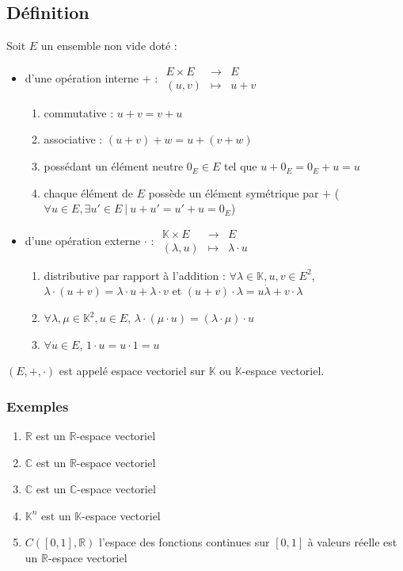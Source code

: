 \documentclass[a4paper,10pt]{book} %
\newcommand{\R}{\mathbb{R}}
\newcommand{\C}{\mathbb{C}}
\newcommand{\K}{\mathbb{K}}
\newcommand{\tq}{~|~}
\begin{document}
\subsection{Définition}
Soit $E$ un ensemble non vide doté :\\
\begin{itemize}
\item d'une opération interne $+$ : $\begin{array}{rcl}E\times E&\rightarrow& E\\ (u,v)&\mapsto &u+v\end{array}$
\begin{enumerate}
\item commutative : $u+v=v+u$
\item associative : $(u+v)+w=u+(v+w)$
\item possédant un élément neutre $0_E\in E$ tel que $u+0_E=0_E+u=u$
\item chaque élément de $E$ possède un élément symétrique par $+$ ($\forall u\in E, \exists u'\in E \tq u+u'=u'+u=0_E$)
\end{enumerate}
\item d'une opération externe $\cdot$ : $\begin{array}{rcl} \K\times E&\rightarrow& E\\ (\lambda,u)&\mapsto&\lambda\cdot u\end{array}$
\begin{enumerate}
\item distributive par rapport à l'addition : $\forall \lambda\in\K, u,v\in E^2$, $\lambda\cdot(u+v)=\lambda \cdot u+\lambda\cdot v$ et $(u+v)\cdot \lambda=u\dot\lambda+v\cdot \lambda$
\item $\forall \lambda,\mu\in\K^2, u\in E$, $\lambda\cdot (\mu\cdot u)=(\lambda\cdot \mu)\cdot u$
\item $\forall u\in E$, $1\cdot u=u\cdot 1=u$
\end{enumerate}
\end{itemize}

$(E,+,\cdot)$ est appelé espace vectoriel sur $\K$ ou $\K$-espace vectoriel.

\subsubsection{Exemples}
\begin{enumerate}
\item $\R$ est un $\R$-espace vectoriel
\item $\C$ est un $\R$-espace vectoriel
\item $\C$ est un $\C$-espace vectoriel
\item $\K^n$ est un $\K$-espace vectoriel
\item $C([0,1],\R)$ l'espace des fonctions continues sur $[0,1]$ à valeurs réelle est un $\R$-espace vectoriel
\end{enumerate}
\end{document}
